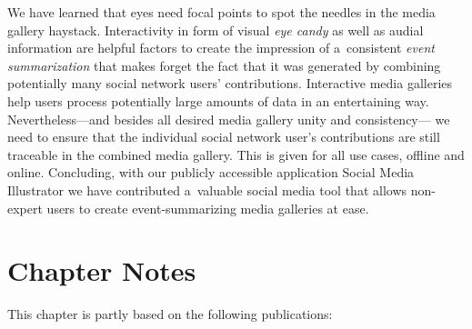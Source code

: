 We have learned that eyes need focal points
to spot the needles in the media gallery haystack.
Interactivity in form of visual \emph{eye candy}
as well as audial information are helpful factors
to create the impression of a~consistent \emph{event summarization}
that makes forget the fact that it was generated by combining potentially
many social network users' contributions.
Interactive media galleries help users process potentially
large amounts of data in an entertaining way.
Nevertheless---and besides all desired media gallery unity and consistency---%
we need to ensure that the individual social network user's contributions
are still traceable in the combined media gallery.
This is given for all use cases, offline and online.
Concluding, with our publicly accessible application Social Media Illustrator
we have contributed a~valuable social media tool
that allows non-expert users to create event-summarizing media galleries at ease.

\section*{Chapter Notes}
This chapter is partly based on the following publications:



